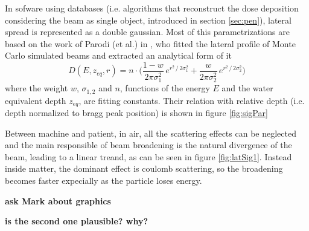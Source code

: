 \documentclass[12pt, a4paper, twoside]{book}
\begin{document}
In sofware using databases (i.e. algorithms that reconstruct the dose deposition considering the beam as single object, introduced in section \ref{sec:pen}), lateral spread is represented as a double gaussian. Most of this parametrizations are based on the work of Parodi (et al.) in \cite{par:latspr}, who fitted the lateral profile of Monte Carlo simulated beams and extracted an analytical form of it
\[
D(E,z_{eq},r) = n\cdot \bigg(  \frac{1-w}{2\pi\sigma_1^2}\,e^{r^2\,/\,2\sigma_1^2} + \frac{w}{2\pi\sigma_2^2}\,e^{r^2\,/\,2\sigma_2^2} \bigg)
\]
where the weight $w$, $\sigma_{1,2}$ and $n$, functions of the energy $E$ and the water equivalent depth $z_{eq}$, are fitting constants. Their relation with relative depth (i.e. depth normalized to bragg peak position) is shown in figure \ref{fig:sigPar}

Between machine and patient, in air, all the scattering effects can be neglected and the main responsible of beam broadening is the natural divergence of the beam, leading to a linear treand, as can be seen in figure \ref{fig:latSig1}. Instead inside matter, the dominant effect is coulomb scattering, so the broadening becomes faster expecially as the particle loses energy.


\textbf{ask Mark about graphics}

\textbf{is the second one plausible? why?}
\end{document}
